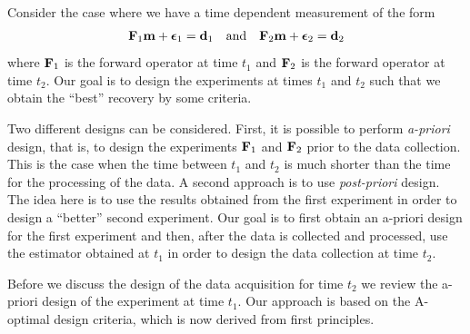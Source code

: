 \documentclass[11pt]{article}
\newcommand{\bfF}	{{\bf{F}}}
\newcommand{\bfd}	{{\bf{d}}}
\newcommand{\bfm}	{{\bf{m}}}
\newcommand{\bfepsilon} {{\boldsymbol \epsilon}}
\begin{document}
 Consider the case where we have a time dependent measurement of the form
\begin{eqnarray}
\label{data}
\bfF_{1} \bfm + \bfepsilon_1 = \bfd_{1}\quad {\rm and} \quad \bfF_{2} \bfm + \bfepsilon_2 = \bfd_{2}
\end{eqnarray}
where $\bfF_{1}$ is the forward operator at time $t_{1}$ and $\bfF_{2}$ is the forward operator 
at time $t_{2}$.
Our goal is to design the experiments at times $t_{1}$ and $t_{2}$ such that we obtain the ``best''
recovery by some criteria.

Two different designs can be considered. First, it is possible to perform {\em a-priori} design, that is,
to design the experiments $\bfF_{1}$ and $\bfF_{2}$ prior to the data collection. This is the case
when the time between $t_{1}$ and $t_{2}$ is much shorter than the time for the processing
of the data. A second approach is to use {\em post-priori} design. The idea here is to use the 
results obtained from the first experiment in order to design a ``better'' second experiment.
Our goal is to first obtain an a-priori design for the first experiment
and then, after the data is collected and processed, use the estimator
obtained at $t_{1}$ in order  to design the data collection
at time $t_{2}$.

Before we discuss the design of the data acquisition for time $t_{2}$
 we review the a-priori design of the experiment at time $t_{1}$. Our approach is based
 on the  A-optimal design criteria, which is now derived from first principles.
 
\end{document}
